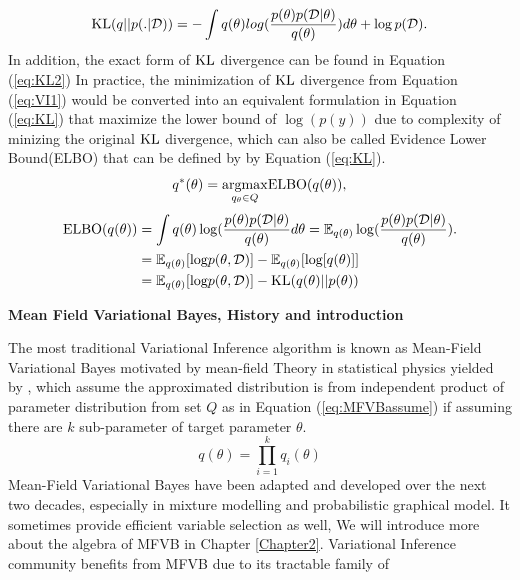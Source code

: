 \begin{equation}
	\label{eq:KL2}
	\textnormal{KL}(q||p(.|\mathcal{D})) = - \int q(\theta)log(\frac{p(\theta)p(\mathcal{D}|\theta)}{q(\theta)}) d\theta + \log p(\mathcal{D}).
\end{equation}
In addition, the exact form of $\textnormal{KL}$ divergence can be found in Equation (\ref{eq:KL2})
In practice, the minimization of $\textnormal{KL}$ divergence from Equation (\ref{eq:VI1}) would be converted into an equivalent formulation in Equation (\ref{eq:KL}) that maximize the lower bound of $\log(p(y))$ due to complexity of minizing the original $\textnormal{KL}$ divergence, which can also be called Evidence Lower Bound(ELBO) that can be defined by by Equation (\ref{eq:KL}).
\begin{equation}
	\label{eq:KL}
	q^*(\theta) = \underset{q_{\theta} \in Q}{\operatorname{ argmax}} \textnormal{ELBO}(q(\theta)),
\end{equation}
\begin{equation}
	\label{eq:ELBO}	
	\begin{aligned}
	\textnormal{ELBO}(q(\theta)) &= \int q(\theta)\log(\frac{p(\theta)p(\mathcal{D}|\theta)}{q(\theta)}d\theta = \mathop{\mathbb{E}_{q(\theta)}}\log(\frac{p(\theta)p(\mathcal{D}|\theta)}{q(\theta)}).\\
	& = \mathop{\mathbb{E}_{q(\theta)}}[\textnormal{log}p(\theta,\mathcal{D})]
	- \mathop{\mathbb{E}_{q(\theta)}}[\textnormal{log}[q(\theta)]]\\
	&= \mathop{\mathbb{E}_{q(\theta)}}[\textnormal{log}p(\theta,\mathcal{D})]
	- \textnormal{KL}(q(\theta)||p(\theta))\\
	\end{aligned}
\end{equation}

\textbf{Mean Field Variational Bayes, History and introduction}

The most traditional Variational Inference algorithm is known as Mean-Field Variational Bayes motivated by mean-field Theory in statistical physics yielded by 
\cite{parisi1988statistical}, which assume the approximated distribution is from independent product of parameter distribution from set $Q$ as in Equation (\ref{eq:MFVBassume}) if assuming there are $k$ sub-parameter of target parameter $\theta$.
\begin{equation}
	\label{eq:MFVBassume}
	q(\theta) = \prod_{i=1}^{k} q_i(\theta)
\end{equation}
Mean-Field Variational Bayes have been adapted and developed over the next two decades, especially in mixture modelling and probabilistic graphical model. It sometimes provide efficient variable selection as well, We will introduce more about the algebra of MFVB in Chapter \ref{Chapter2}. Variational Inference community benefits from MFVB due to its tractable family of 

